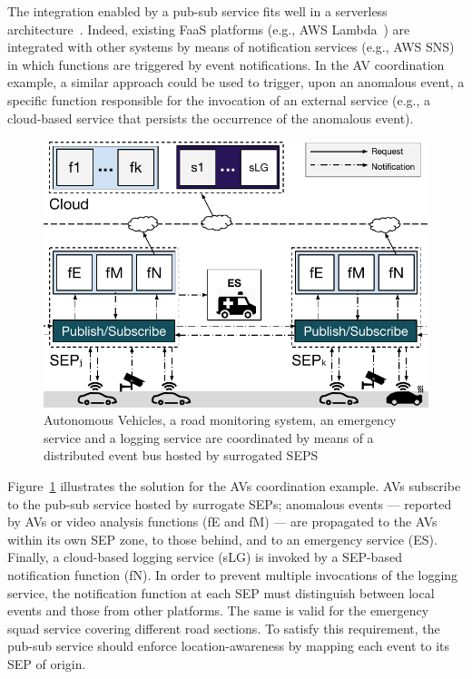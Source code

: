 The integration enabled by a pub-sub service fits well in a serverless architecture~\cite{Lloyd18serverless}. Indeed, existing FaaS platforms (e.g., AWS Lambda~\cite{AWSLambda}) are integrated with other systems by means of notification services (e.g., AWS SNS) in which functions are triggered by event notifications. In the AV coordination example, a similar approach could be used to trigger, upon an anomalous event, a specific function responsible for the invocation of an external service (e.g., a cloud-based service that persists the occurrence of the anomalous event). 

\begin{figure}[tbp]
	\centering
	\includegraphics[width=1\linewidth]{Figs/Edge_Coordination_AVs_wide.pdf}
	\caption{Autonomous Vehicles, a road monitoring system, an emergency service and a logging service are coordinated by means of a distributed event bus hosted by surrogated SEPS}
	\label{fig:Edge_Coordination_AVs}
\end{figure}

Figure~\ref{fig:Edge_Coordination_AVs} illustrates the solution for the AVs coordination example. AVs subscribe to the pub-sub service hosted by surrogate SEPs; anomalous events --- reported by AVs or video analysis functions (fE and fM) --- are propagated to the AVs within its own SEP zone, to those behind, and to an emergency service (ES). Finally, a cloud-based logging service (sLG) is invoked by a SEP-based notification function (fN). In order to prevent multiple invocations of the logging service, the notification function at each SEP must distinguish between local events and those from other platforms. The same is valid for the emergency squad service covering different road sections. To satisfy this requirement, the pub-sub service should enforce location-awareness by mapping each event to its SEP of origin.

